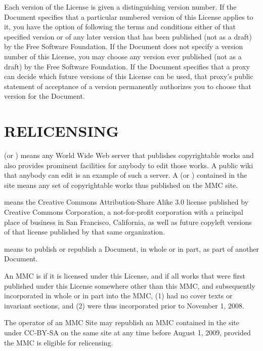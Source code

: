 Each version of the License is given a distinguishing version
number. If the Document specifies that a particular numbered
version of this License  applies to
it, you have the option of following the terms and conditions
either of that specified version or of any later version
that has been published (not as a draft) by the Free Software
Foundation. If the Document does not specify a version number
of this License, you may choose any version ever published
(not as a draft) by the Free Software Foundation. If the
Document specifies that a proxy can decide which future
versions of this License can be used, that proxy\textquoteright s public
statement of acceptance of a version permanently authorizes
you to choose that version for the Document.

\section{RELICENSING}
\label{gnu:relicensing}
 (or ) means any World Wide Web server that publishes
copyrightable works and also provides prominent facilities for
anybody to edit those works. A public wiki that anybody can
edit is an example of such a server. A  (or ) contained in the site means
any set of copyrightable works thus published on the MMC site.

 means the Creative Commons Attribution-Share
Alike 3.0 license published by Creative Commons Corporation, a
not-for-profit corporation with a principal place of business
in San Francisco, California, as well as future copyleft
versions of that license published by that same organization.

 means to publish or republish a Document,
in whole or in part, as part of another Document.

An MMC is  if it is licensed
under this License, and if all works that were first
published under this License somewhere other than this MMC,
and subsequently incorporated in whole or in part into the
MMC, (1) had no cover texts or invariant sections, and (2)
were thus incorporated prior to November 1, 2008.

The operator of an MMC Site may republish an MMC contained in
the site under CC-BY-SA on the same site at any time before
August 1, 2009, provided the MMC is eligible for relicensing.

